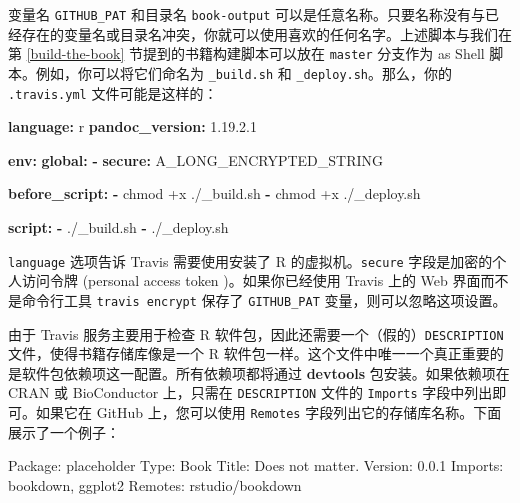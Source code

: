 \documentclass[
  12pt,
]{krantz}
\newenvironment{Shaded}{\begin{snugshade}}{\end{snugshade}}
\newcommand{\AttributeTok}[1]{\textcolor[rgb]{0.13,0.29,0.53}{#1}}
\newcommand{\FloatTok}[1]{\textcolor[rgb]{0.00,0.00,0.81}{#1}}
\newcommand{\FunctionTok}[1]{\textcolor[rgb]{0.13,0.29,0.53}{\textbf{#1}}}
\newcommand{\KeywordTok}[1]{\textcolor[rgb]{0.13,0.29,0.53}{\textbf{#1}}}
\newcommand{\NormalTok}[1]{#1}
\theoremstyle{definition}
\theoremstyle{definition}
\theoremstyle{definition}
\theoremstyle{definition}
\theoremstyle{remark}
\begin{document}
变量名 \texttt{GITHUB\_PAT} 和目录名 \texttt{book-output} 可以是任意名称。只要名称没有与已经存在的变量名或目录名冲突，你就可以使用喜欢的任何名字。上述脚本与我们在第 \ref{build-the-book} 节提到的书籍构建脚本可以放在 \texttt{master} 分支作为 as Shell 脚本。例如，你可以将它们命名为 \texttt{\_build.sh} 和 \texttt{\_deploy.sh}。那么，你的 \texttt{.travis.yml} 文件可能是这样的：

\begin{Shaded}
\begin{Highlighting}[]
\FunctionTok{language}\KeywordTok{:}\AttributeTok{ r}
\FunctionTok{pandoc\_version}\KeywordTok{:}\AttributeTok{ }\FloatTok{1.19.2.1}

\FunctionTok{env}\KeywordTok{:}
\AttributeTok{  }\FunctionTok{global}\KeywordTok{:}
\AttributeTok{    }\KeywordTok{{-}}\AttributeTok{ }\FunctionTok{secure}\KeywordTok{:}\AttributeTok{ A\_LONG\_ENCRYPTED\_STRING}

\FunctionTok{before\_script}\KeywordTok{:}
\AttributeTok{  }\KeywordTok{{-}}\AttributeTok{ chmod +x ./\_build.sh}
\AttributeTok{  }\KeywordTok{{-}}\AttributeTok{ chmod +x ./\_deploy.sh}

\FunctionTok{script}\KeywordTok{:}
\AttributeTok{  }\KeywordTok{{-}}\AttributeTok{ ./\_build.sh}
\AttributeTok{  }\KeywordTok{{-}}\AttributeTok{ ./\_deploy.sh}
\end{Highlighting}
\end{Shaded}

\texttt{language} 选项告诉 Travis 需要使用安装了 R 的虚拟机。\texttt{secure} 字段是加密的个人访问令牌 (personal access token )。如果你已经使用 Travis 上的 Web 界面而不是命令行工具 \texttt{travis\ encrypt} 保存了 \texttt{GITHUB\_PAT} 变量，则可以忽略这项设置。

由于 Travis 服务主要用于检查 R 软件包，因此还需要一个（假的）\texttt{DESCRIPTION} 文件，使得书籍存储库像是一个 R 软件包一样。这个文件中唯一一个真正重要的是软件包依赖项这一配置。所有依赖项都将通过 \textbf{devtools} 包安装。如果依赖项在 CRAN 或 BioConductor 上，只需在 \texttt{DESCRIPTION} 文件的 \texttt{Imports} 字段中列出即可。如果它在 GitHub 上，您可以使用 \texttt{Remotes} 字段列出它的存储库名称。下面展示了一个例子：

\begin{Shaded}
\begin{Highlighting}[]
\NormalTok{Package: placeholder}
\NormalTok{Type: Book}
\NormalTok{Title: Does not matter.}
\NormalTok{Version: 0.0.1}
\NormalTok{Imports: bookdown, ggplot2}
\NormalTok{Remotes: rstudio/bookdown}
\end{Highlighting}
\end{Shaded}
\end{document}

